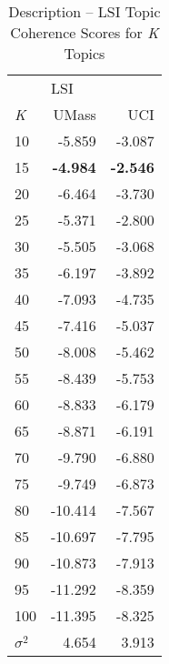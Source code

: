 \documentclass[letterpaper,12pt]{article}
\begin{document}
\begin{table}
	\caption{\label{tab:lsi_tc_scores} Description -- LSI Topic Coherence Scores for \emph{K} Topics}
	\begin{center}
		\begin{tabular}{lrr}
			\toprule
			{} & \multicolumn{2}{l}{LSI} \\
			\emph{K} &   UMass &    UCI \\
			\midrule
			10  &  -5.859 & -3.087 \\
			15  &  \textbf{-4.984} & \textbf{-2.546} \\
			20  &  -6.464 & -3.730 \\
			25  &  -5.371 & -2.800 \\
			30  &  -5.505 & -3.068 \\
			35  &  -6.197 & -3.892 \\
			40  &  -7.093 & -4.735 \\
			45  &  -7.416 & -5.037 \\
			50  &  -8.008 & -5.462 \\
			55  &  -8.439 & -5.753 \\
			60  &  -8.833 & -6.179 \\
			65  &  -8.871 & -6.191 \\
			70  &  -9.790 & -6.880 \\
			75  &  -9.749 & -6.873 \\
			80  & -10.414 & -7.567 \\
			85  & -10.697 & -7.795 \\
			90  & -10.873 & -7.913 \\
			95  & -11.292 & -8.359 \\
			100 & -11.395 & -8.325 \\
			\midrule
			$\sigma^2$ & 4.654 & 3.913 \\
			\bottomrule
			\end{tabular}
	\end{center}
\end{table}
\end{document}
